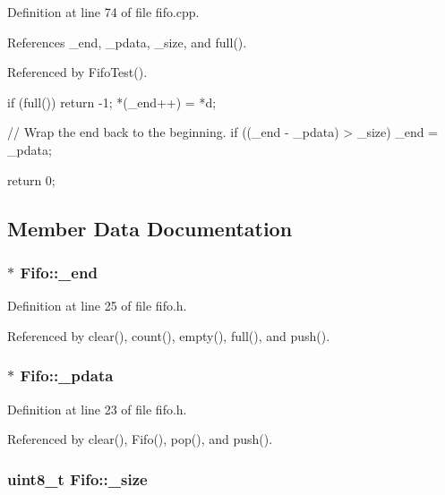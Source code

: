 Definition at line 74 of file fifo.cpp.



References \_\-end, \_\-pdata, \_\-size, and full().



Referenced by FifoTest().


\begin{DoxyCode}
{
    if (full()) return -1;
    *(_end++) = *d;
    
    // Wrap the end back to the beginning.
    if ((_end - _pdata) > _size) {
        _end = _pdata;
    }

        return 0;
}
\end{DoxyCode}


\subsection{Member Data Documentation}
\hypertarget{class_fifo_a5dea8e3ee360dd0555d25f1a57938a8f}{
\subsubsection[{\_\-end}]{$\ast$ {\bf Fifo::\_\-end}}}
\label{class_fifo_a5dea8e3ee360dd0555d25f1a57938a8f}


Definition at line 25 of file fifo.h.



Referenced by clear(), count(), empty(), full(), and push().

\hypertarget{class_fifo_adb3c9f91291d0af42197c7b30a718506}{
\subsubsection[{\_\-pdata}]{$\ast$ {\bf Fifo::\_\-pdata}}}
\label{class_fifo_adb3c9f91291d0af42197c7b30a718506}


Definition at line 23 of file fifo.h.



Referenced by clear(), Fifo(), pop(), and push().

\hypertarget{class_fifo_a0eb7824d54929e385223ef2e32c45c91}{
\subsubsection[{\_\-size}]{\setlength{\rightskip}{0pt plus 5cm}uint8\_\-t {\bf Fifo::\_\-size}}}
\label{class_fifo_a0eb7824d54929e385223ef2e32c45c91}


